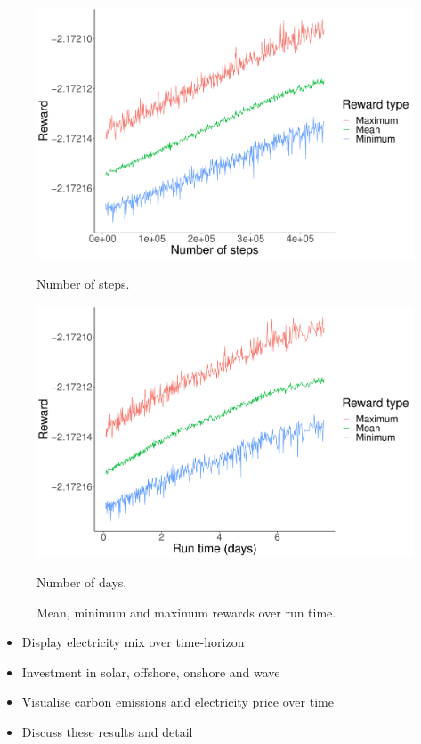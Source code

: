 \documentclass{article}
\begin{document}
\begin{figure}
\centering
\begin{minipage}{.5\textwidth}
  \centering
  \includegraphics[width=\linewidth]{figures/runtime_steps_plot.pdf}
  \caption{Number of steps.}
  \label{fig:electricity_generated_plot}
\end{minipage}%
\begin{minipage}{.5\textwidth}
  \centering
  \includegraphics[width=\linewidth]{figures/runtime_days_plot.pdf}
  \caption{Number of days.}
  \label{fig:emissions_plot}
\end{minipage}
\caption{Mean, minimum and maximum rewards over run time.}
\end{figure}





\begin{itemize}
	\item Display electricity mix over time-horizon
	\item Investment in solar, offshore, onshore and wave
	\item Visualise carbon emissions and electricity price over time
	\item Discuss these results and detail 
\end{itemize}





\end{document}
